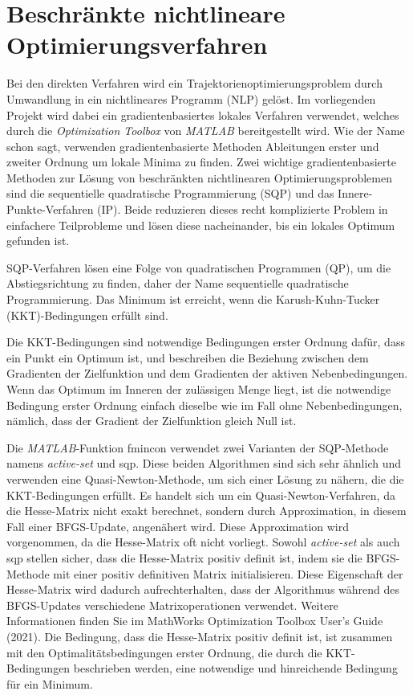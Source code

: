 \section{Beschränkte nichtlineare Optimierungsverfahren}
Bei den direkten Verfahren wird ein Trajektorienoptimierungsproblem durch Umwandlung in ein nichtlineares Programm (NLP) gelöst. Im vorliegenden Projekt wird dabei ein gradientenbasiertes lokales Verfahren verwendet, welches durch die \textit{Optimization Toolbox} von \textit{MATLAB} bereitgestellt wird. Wie der Name schon sagt, verwenden gradientenbasierte Methoden Ableitungen erster und zweiter Ordnung um lokale Minima zu finden. Zwei wichtige gradientenbasierte Methoden zur Lösung von beschränkten nichtlinearen Optimierungsproblemen sind die sequentielle quadratische Programmierung (SQP) und das Innere-Punkte-Verfahren (IP). Beide reduzieren dieses recht komplizierte Problem in einfachere Teilprobleme und lösen diese nacheinander, bis ein lokales Optimum gefunden ist.

SQP-Verfahren lösen eine Folge von quadratischen Programmen (QP), um die Abstiegsrichtung zu finden, daher der Name sequentielle quadratische Programmierung. Das Minimum ist erreicht, wenn die Karush-Kuhn-Tucker (KKT)-Bedingungen erfüllt sind.

Die KKT-Bedingungen sind notwendige Bedingungen erster Ordnung dafür, dass ein Punkt ein Optimum ist, und beschreiben die Beziehung zwischen dem Gradienten der Zielfunktion und dem Gradienten der aktiven Nebenbedingungen. Wenn das Optimum im Inneren der zulässigen Menge liegt, ist die notwendige Bedingung erster Ordnung einfach dieselbe wie im Fall ohne Nebenbedingungen, nämlich, dass der Gradient der Zielfunktion gleich Null ist.

Die \textit{MATLAB}-Funktion fmincon verwendet zwei Varianten der SQP-Methode namens \textit{active-set} und sqp. Diese beiden Algorithmen sind sich sehr ähnlich und verwenden eine Quasi-Newton-Methode, um sich einer Lösung zu nähern, die die KKT-Bedingungen erfüllt. Es handelt sich um ein Quasi-Newton-Verfahren, da die Hesse-Matrix nicht exakt berechnet, sondern durch Approximation, in diesem Fall einer BFGS-Update, angenähert wird. Diese Approximation wird vorgenommen, da die Hesse-Matrix oft nicht vorliegt. Sowohl \textit{active-set} als auch sqp stellen sicher, dass die Hesse-Matrix positiv definit ist, indem sie die BFGS-Methode mit einer positiv definitiven Matrix initialisieren. Diese Eigenschaft der Hesse-Matrix wird dadurch aufrechterhalten, dass der Algorithmus während des BFGS-Updates verschiedene Matrixoperationen verwendet. Weitere Informationen finden Sie im MathWorks Optimization Toolbox User's Guide (2021). Die Bedingung, dass die Hesse-Matrix positiv definit ist, ist zusammen mit den Optimalitätsbedingungen erster Ordnung, die durch die KKT-Bedingungen beschrieben werden, eine notwendige und hinreichende Bedingung für ein Minimum. 


